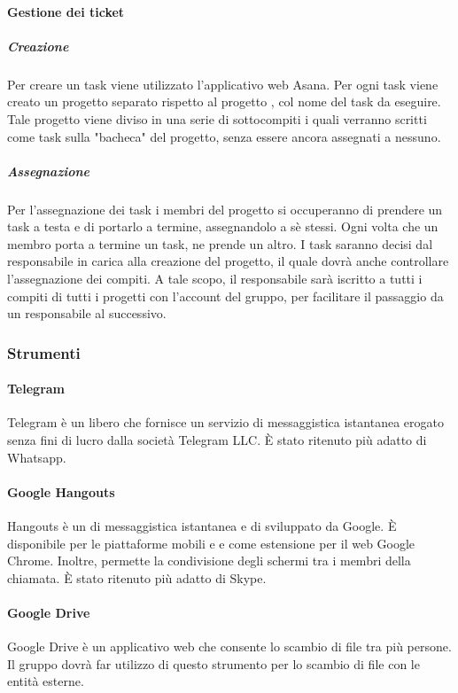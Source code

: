  \paragraph{Gestione dei ticket}
 \subparagraph{Creazione}
Per creare un task viene utilizzato l'applicativo web Asana. Per ogni task viene creato un progetto separato rispetto al progetto \PROGETTO{}, col nome del task da eseguire. Tale progetto viene diviso in una serie di sottocompiti i quali verranno scritti come task sulla "bacheca" del
progetto, senza essere ancora assegnati a nessuno.
 \subparagraph{Assegnazione}
 Per l'assegnazione dei task i membri del progetto si occuperanno
di prendere un task a testa e di portarlo a termine, assegnandolo a sè stessi. Ogni
volta che un membro porta a termine un task, ne prende un altro. I task
saranno decisi dal responsabile in carica alla creazione del progetto, il quale
dovrà anche controllare l'assegnazione dei compiti. A tale scopo,
il responsabile sarà iscritto a tutti i compiti di tutti i progetti con l'account del gruppo,
per facilitare il passaggio da un responsabile al successivo.
\subsubsection{Strumenti}
 \paragraph{Telegram}
 Telegram è un  libero che fornisce un servizio di messaggistica istantanea erogato senza fini di lucro dalla società Telegram LLC. È stato ritenuto più adatto di Whatsapp.
 \paragraph{Google Hangouts}
 Hangouts è un  di messaggistica istantanea e di    sviluppato da Google. È disponibile per le piattaforme mobili  e  e come estensione per il  web Google Chrome. Inoltre, permette la condivisione degli schermi tra i membri della chiamata. È stato ritenuto più adatto di Skype.
 \paragraph{Google Drive}
 Google Drive è un applicativo web che consente lo scambio di file tra più persone. Il gruppo \GRUPPO dovrà far utilizzo di questo strumento per lo scambio di file con le entità esterne.
